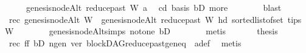 \begin{isabellebody}
\ \ \ \ \ {\isacharparenleft}{\kern0pt}genesis{\isacharunderscore}{\kern0pt}nodeAlt\ {\isacharparenleft}{\kern0pt}reduce{\isacharunderscore}{\kern0pt}past\ W\ a{\isacharparenright}{\kern0pt}{\isacharparenright}{\kern0pt}{\isachardoublequoteclose}\ \isamarkupfalse%
\ cd{}\ basis\ bD{}\ more\isanewline
\ \ \ \ \ \ \isamarkupfalse%
\ blast\isanewline
\ \ \ \ \isamarkupfalse%
\ rec{\isacharcolon}{\kern0pt}\ {\isachardoublequoteopen}genesis{\isacharunderscore}{\kern0pt}nodeAlt\ W\ {\isacharequal}{\kern0pt}\ genesis{\isacharunderscore}{\kern0pt}nodeAlt\ {\isacharparenleft}{\kern0pt}reduce{\isacharunderscore}{\kern0pt}past\ W\ {\isacharparenleft}{\kern0pt}hd\ {\isacharparenleft}{\kern0pt}sorted{\isacharunderscore}{\kern0pt}list{\isacharunderscore}{\kern0pt}of{\isacharunderscore}{\kern0pt}set\ {\isacharparenleft}{\kern0pt}tips\ W{\isacharparenright}{\kern0pt}{\isacharparenright}{\kern0pt}{\isacharparenright}{\kern0pt}{\isacharparenright}{\kern0pt}{\isachardoublequoteclose}\isanewline
\ \ \ \ \ \ \isamarkupfalse%
\ genesis{\isacharunderscore}{\kern0pt}nodeAlt{\isachardot}{\kern0pt}simps\ not{\isacharunderscore}{\kern0pt}one\ bD\isanewline
\ \ \ \ \ \ \isamarkupfalse%
\ metis\ \isanewline
\ \ \ \ \isamarkupfalse%
\ {\isacharquery}{\kern0pt}thesis\ \isamarkupfalse%
\ rec\ ff\ bD\ n{\isacharunderscore}{\kern0pt}gen\ ver\ blockDAG{\isachardot}{\kern0pt}reduce{\isacharunderscore}{\kern0pt}past{\isacharunderscore}{\kern0pt}gen{\isacharunderscore}{\kern0pt}eq\ \ a{\isacharunderscore}{\kern0pt}def\ \isamarkupfalse%
\ metis\isanewline
\ \ \isamarkupfalse%
\isanewline
{}\isamarkupfalse%
%
\endisatagproof
{\isafoldproof}%
%
\isadelimproof
\isanewline
%
\endisadelimproof
\isanewline
%
\isadelimtheory
\isanewline
%
\endisadelimtheory
%
\isatagtheory
{}\isamarkupfalse%
%
\endisatagtheory
{\isafoldtheory}%
%
\isadelimtheory
%
\endisadelimtheory
%
\end{isabellebody}%
\endinput
